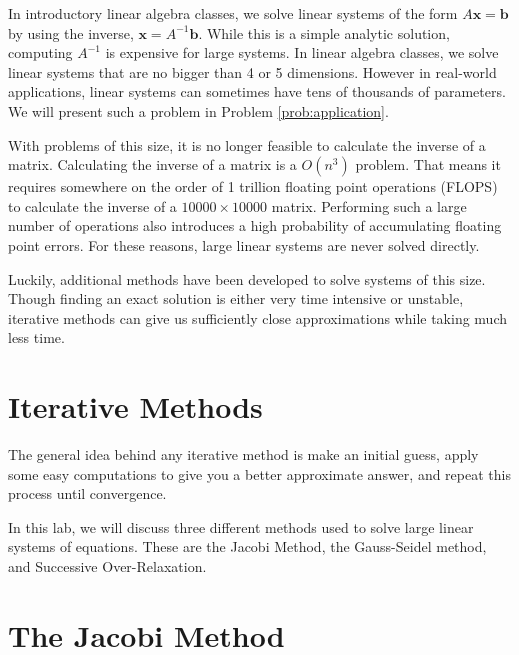 \label{lab:iter_methods}


In introductory linear algebra classes, we solve linear systems of the form
$A\mathbf{x} = \mathbf{b}$ by using the inverse, $\mathbf{x} = A^{-1}\mathbf{b}$.
While this is a simple analytic solution, computing $A^{-1}$ is expensive for
large systems.
In linear algebra classes, we solve linear systems that are no bigger than 4 or 5
dimensions. However in real-world applications, linear systems can sometimes have
tens of thousands of parameters. We will present such a problem in
Problem \ref{prob:application}.

With problems of this size, it is no longer feasible to calculate the inverse of
a matrix. Calculating the inverse of a matrix is a $O(n^3)$ problem.
That means it requires somewhere on the order
of 1 trillion floating point operations (FLOPS) to calculate the inverse of a
$10000 \times 10000$ matrix. Performing such a large number of operations also
introduces a high probability of accumulating floating point errors. For these
reasons, large linear systems are never solved directly.

Luckily, additional methods have been developed to solve systems of this size.
Though finding an exact solution is either very time intensive or unstable,
iterative methods can give us sufficiently close approximations while taking
much less time.

\section*{Iterative Methods} %

The general idea behind any iterative method is make an initial guess, apply some
easy computations to give you a better approximate answer,
and repeat this process until convergence.

In this lab, we will discuss three different methods used to solve large linear
systems of equations. These are the Jacobi Method, the Gauss-Seidel method, and
Successive Over-Relaxation.

\section*{The Jacobi Method} %

